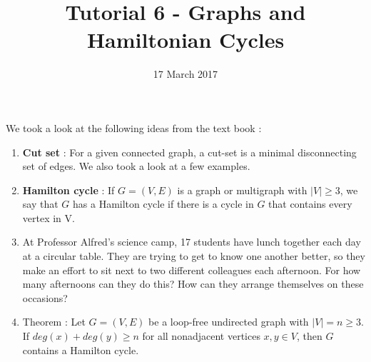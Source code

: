 \documentclass[a4paper]{article}
\title{Tutorial 6 - Graphs and Hamiltonian Cycles}
\date{17 March 2017}
\begin{document}
\maketitle
We took a look at the following ideas from the text book :

\begin{enumerate}
    \item \textbf{Cut set} : For a given connected graph, a cut-set is a minimal disconnecting set of edges. We also took a look at a few examples.

	\item \textbf{Hamilton cycle} : If $G = (V, E)$ is a graph or multigraph with $|V| \geq 3$, we say that $G$ has a Hamilton cycle
if there is a cycle in $G$ that contains every vertex in V.    
    
    \item At Professor Alfred's science camp, 17 students have lunch together each day at a circular table. They are trying to get to know one another better, so they make an effort to sit next to
two different colleagues each afternoon. For how many afternoons can they do this? How can they arrange themselves on these occasions?

	\item Theorem : Let $G = (V, E)$ be a loop-free undirected graph with $|V| = n \geq 3$. If $deg(x) + deg(y) \geq n$
for all nonadjacent vertices $x,y \in V$, then $G$ contains a Hamilton cycle.


\end{enumerate}
\end{document}
